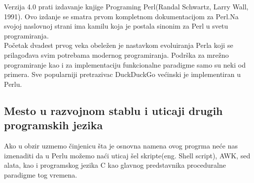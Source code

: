 \documentclass[a4paper]{article}
\begin{document}
Verzija 4.0 prati izdavanje knjige Programing Perl(Randal Schwartz, Larry Wall, 1991). Ovo izdanje se smatra prvom kompletnom dokumentacijom za Perl.Na svojoj naslovnoj strani ima kamilu koja je postala sinonim za Perl u svetu programiranja\cite{perlOrg}.\\

Početak dvadest prvog veka obeležen je nastavkom evoluiranja Perla koji se prilagođava svim potrebama modernog programiranja. Podrška za mrežno programiranje kao i za implementaciju funkcionalne paradigme samo su neki od primera. Sve popularniji pretrazivac DuckDuckGo većinski je implementiran u Perlu\cite{duck}.

\subsection{Mesto u razvojnom stablu i uticaji drugih programskih jezika}



Ako u obzir uzmemo činjenicu šta je osnovna namena ovog progrma neće nas iznenaditi da u  Perlu možemo naći uticaj šel skripte(eng. Shell script), AWK, sed alata, kao i programskog jezika C kao glavnog predstavnika proceduralne paradigme tog vremena.\cite{friedl2006mastering}\\
\end{document}
